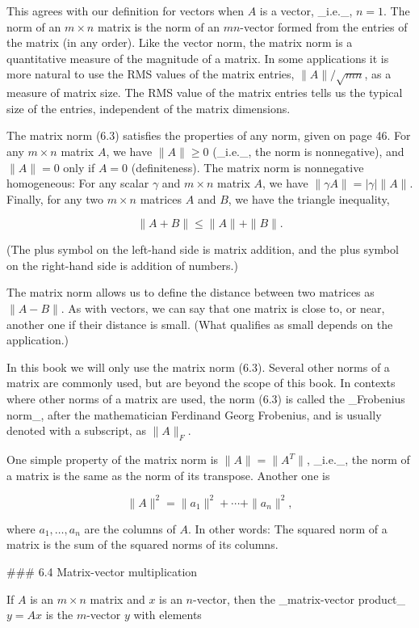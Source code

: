 This agrees with our definition for vectors when \(A\) is a vector, _i.e._, \(n=1\). The norm of an \(m\times n\) matrix is the norm of an \(mn\)-vector formed from the entries of the matrix (in any order). Like the vector norm, the matrix norm is a quantitative measure of the magnitude of a matrix. In some applications it is more natural to use the RMS values of the matrix entries, \(\|A\|/\sqrt{mn}\), as a measure of matrix size. The RMS value of the matrix entries tells us the typical size of the entries, independent of the matrix dimensions.

The matrix norm (6.3) satisfies the properties of any norm, given on page 46. For any \(m\times n\) matrix \(A\), we have \(\|A\|\geq 0\) (_i.e._, the norm is nonnegative), and \(\|A\|=0\) only if \(A=0\) (definiteness). The matrix norm is nonnegative homogeneous: For any scalar \(\gamma\) and \(m\times n\) matrix \(A\), we have \(\|\gamma A\|=|\gamma|\|A\|\). Finally, for any two \(m\times n\) matrices \(A\) and \(B\), we have the triangle inequality,

\[\|A+B\|\leq\|A\|+\|B\|.\]

(The plus symbol on the left-hand side is matrix addition, and the plus symbol on the right-hand side is addition of numbers.)

The matrix norm allows us to define the distance between two matrices as \(\|A-B\|\). As with vectors, we can say that one matrix is close to, or near, another one if their distance is small. (What qualifies as small depends on the application.)

In this book we will only use the matrix norm (6.3). Several other norms of a matrix are commonly used, but are beyond the scope of this book. In contexts where other norms of a matrix are used, the norm (6.3) is called the _Frobenius norm_, after the mathematician Ferdinand Georg Frobenius, and is usually denoted with a subscript, as \(\|A\|_{F}\).

One simple property of the matrix norm is \(\|A\|=\|A^{T}\|\), _i.e._, the norm of a matrix is the same as the norm of its transpose. Another one is

\[\|A\|^{2}=\|a_{1}\|^{2}+\cdots+\|a_{n}\|^{2},\]

where \(a_{1},\ldots,a_{n}\) are the columns of \(A\). In other words: The squared norm of a matrix is the sum of the squared norms of its columns.

### 6.4 Matrix-vector multiplication

If \(A\) is an \(m\times n\) matrix and \(x\) is an \(n\)-vector, then the _matrix-vector product_\(y=Ax\) is the \(m\)-vector \(y\) with elements

